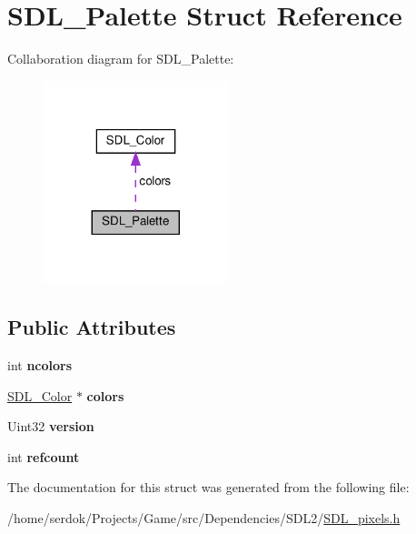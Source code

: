 \hypertarget{structSDL__Palette}{}\section{S\+D\+L\+\_\+\+Palette Struct Reference}
\label{structSDL__Palette}


Collaboration diagram for S\+D\+L\+\_\+\+Palette\+:\nopagebreak
\begin{figure}[H]
\begin{center}
\leavevmode
\includegraphics[width=152pt]{structSDL__Palette__coll__graph}
\end{center}
\end{figure}
\subsection*{Public Attributes}
\begin{DoxyCompactItemize}
\item 
\mbox{\label{structSDL__Palette_a81a0cc3197480e994c6b06f1f0567091}} 
int {\bfseries ncolors}
\item 
\mbox{\label{structSDL__Palette_ad757a50037f43533196e94942440b241}} 
\hyperlink{structSDL__Color}{S\+D\+L\+\_\+\+Color} $\ast$ {\bfseries colors}
\item 
\mbox{\label{structSDL__Palette_a5b8d45519f6850a32f13f1602ce37a8e}} 
Uint32 {\bfseries version}
\item 
\mbox{\label{structSDL__Palette_a35c667737f883f973bb0a8dea143b08d}} 
int {\bfseries refcount}
\end{DoxyCompactItemize}


The documentation for this struct was generated from the following file\+:\begin{DoxyCompactItemize}
\item 
/home/serdok/\+Projects/\+Game/src/\+Dependencies/\+S\+D\+L2/\hyperlink{SDL__pixels_8h}{S\+D\+L\+\_\+pixels.\+h}\end{DoxyCompactItemize}
